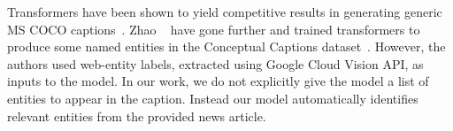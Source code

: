 Transformers have been shown to yield competitive results in generating generic
MS COCO captions~\cite{Zhu2018CaptioningTW, Li2019Boosted}. Zhao
\etal~\cite{Zhao2019InformativeIC} have gone further and trained transformers
to produce some named entities in the Conceptual Captions
dataset~\cite{Sharma2018ConceptualCA}. However, the authors used web-entity labels, extracted using
Google Cloud Vision API, as inputs to the model. In our work, we do not
explicitly give the model a list of entities to appear in the caption. Instead
our model automatically identifies relevant entities from the provided news
article.

